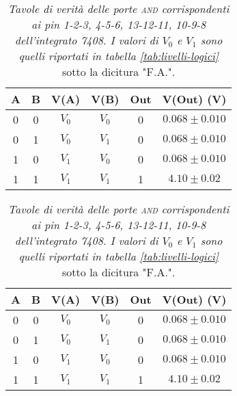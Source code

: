 \begin{table}[H]
  \vspace{.5mm}

  \begin{subtable}[H]{0.5\textwidth}
    \centering
    \begin{tabular}[t]{c  c | c  c | c  c}
      \hline
      A & B & V(A) & V(B) & Out & V(Out) (V)\\
      \hline
      0 & 0 & $V_{0}$ & $V_{0}$ & 0 & $0.068 \pm 0.010$ \\
      0 & 1 & $V_{0}$ & $V_{1}$ & 0 & $0.068 \pm 0.010$ \\
      1 & 0 & $V_{1}$ & $V_{0}$ & 0 & $0.068 \pm 0.010$ \\
      1 & 1 & $V_{1}$ & $V_{1}$ & 1 & $4.10 \pm 0.02$ \\
      \hline
    \end{tabular}
  \end{subtable}

  \vspace{.5cm}

  \begin{subtable}[H]{0.5\textwidth}
    \centering
    \begin{tabular}[t]{c  c | c  c | c  c}
      \hline
      A & B & V(A) & V(B) & Out & V(Out) (V)\\
      \hline
      0 & 0 & $V_{0}$ & $V_{0}$ & 0 & $0.068 \pm 0.010$ \\
      0 & 1 & $V_{0}$ & $V_{1}$ & 0 & $0.068 \pm 0.010$ \\
      1 & 0 & $V_{1}$ & $V_{0}$ & 0 & $0.068 \pm 0.010$ \\
      1 & 1 & $V_{1}$ & $V_{1}$ & 1 & $4.10 \pm 0.02$ \\
      \hline
    \end{tabular}
  \end{subtable}
  \caption{\emph{Tavole di verità delle porte \textsc{and} corrispondenti ai pin 1-2-3, 4-5-6, 13-12-11, 10-9-8 dell'integrato 7408. I valori di $V_{0}$ e $V_{1}$ sono quelli riportati in tabella \ref{tab:livelli-logici}} sotto la dicitura "F.A.".}
  \label{tab:and1-multiplexer}
\end{table}

